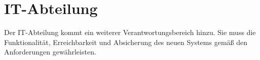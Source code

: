 \section*{IT-Abteilung}

Der IT-Abteilung kommt ein weiterer Verantwortungsbereich hinzu. Sie muss die Funktionalität, Erreichbarkeit und Absicherung des neuen Systems gemäß den Anforderungen gewährleisten.